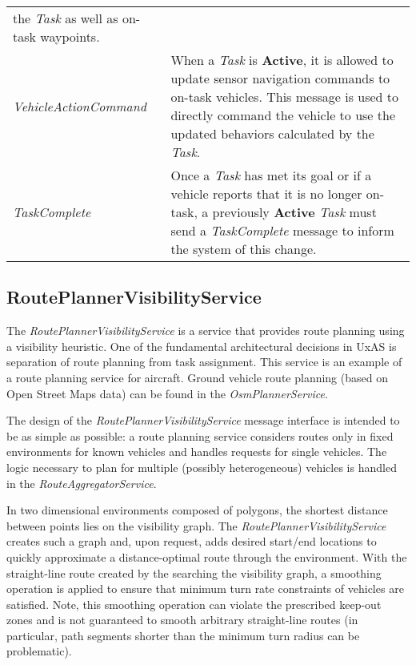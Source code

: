 \begin{longtable}[c]{@{}ll@{}}
\begin{minipage}[t]{0.65\columnwidth}
the \emph{Task} as well as on-task waypoints.
\strut\end{minipage}\tabularnewline
\begin{minipage}[t]{0.29\columnwidth}\raggedright\strut
\emph{VehicleActionCommand}
\strut\end{minipage} &
\begin{minipage}[t]{0.65\columnwidth}\raggedright\strut
When a \emph{Task} is \textbf{Active}, it is allowed to update sensor
navigation commands to on-task vehicles. This message is used to
directly command the vehicle to use the updated behaviors calculated by
the \emph{Task}.
\strut\end{minipage}\tabularnewline
\begin{minipage}[t]{0.29\columnwidth}\raggedright\strut
\emph{TaskComplete}
\strut\end{minipage} &
\begin{minipage}[t]{0.65\columnwidth}\raggedright\strut
Once a \emph{Task} has met its goal or if a vehicle reports that it is
no longer on-task, a previously \textbf{Active} \emph{Task} must send a
\emph{TaskComplete} message to inform the system of this change.
\strut\end{minipage}\tabularnewline
\bottomrule
\end{longtable}

\subsection{RoutePlannerVisibilityService}\label{routeplannervisibilityservice}

The \emph{RoutePlannerVisibilityService} is a service that provides
route planning using a visibility heuristic. One of the fundamental
architectural decisions in UxAS is separation of route planning from
task assignment. This service is an example of a route planning service
for aircraft. Ground vehicle route planning (based on Open Street Maps
data) can be found in the \emph{OsmPlannerService}.

The design of the \emph{RoutePlannerVisibilityService} message interface
is intended to be as simple as possible: a route planning service
considers routes only in fixed environments for known vehicles and
handles requests for single vehicles. The logic necessary to plan for
multiple (possibly heterogeneous) vehicles is handled in the
\emph{RouteAggregatorService}.

In two dimensional environments composed of polygons, the shortest
distance between points lies on the visibility graph. The
\emph{RoutePlannerVisibilityService} creates such a graph and, upon
request, adds desired start/end locations to quickly approximate a
distance-optimal route through the environment. With the straight-line
route created by the searching the visibility graph, a smoothing
operation is applied to ensure that minimum turn rate constraints of
vehicles are satisfied. Note, this smoothing operation can violate the
prescribed keep-out zones and is not guaranteed to smooth arbitrary
straight-line routes (in particular, path segments shorter than the
minimum turn radius can be problematic).

